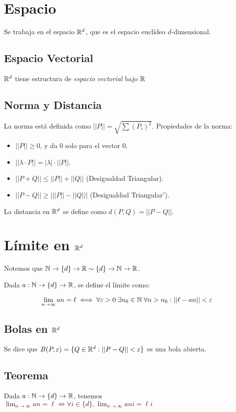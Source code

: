 \documentclass{article}
\begin{document}
\section{Espacio}
Se trabaja en el espacio $\mathbb{R}^d$, que es el espacio euclídeo $d$-dimensional.

\subsection{Espacio Vectorial}
$\mathbb{R}^d$ tiene estructura de \emph{espacio vectorial} bajo $\mathbb{R}$

\subsection{Norma y Distancia}
La norma  está definida como $||P|| = \sqrt{\sum (P_i)^2}$.
Propiedades de la norma:
\begin{itemize}
	\item $||P|| \geq 0$, y da $0$ solo para el vector $0$.
	\item $||\lambda \cdot P|| = |\lambda|\cdot||P||$.
	\item $||P+Q|| \leq ||P|| + ||Q||$ (Desigualdad Triangular).
	\item $||P-Q|| \geq \big|||P|| - ||Q||\big|$ (Desigualdad Triangular$'$).
\end{itemize}

La distancia en $\mathbb{R}^d$ se define como $d(P, Q) = ||P-Q||$.

\section{Límite en $\mathbb{R}^d$}
Notemos que $\mathbb{N} \to \{d\} \to \mathbb{R} \sim \{d\} \to \mathbb{N} \to \mathbb{R}$.

Dada $a : \mathbb{N} \to \{d\} \to \mathbb{R}$, se define el límite como:

\[\lim_{n \to \infty} an = \ell \iff \forall \varepsilon > 0 \;
	\exists n_0 \in \mathbb{N} \;\forall
n > n_0 : ||\ell - an|| < \varepsilon\]

\subsection{Bolas en $\mathbb{R}^d$}
Se dice que $B(P, \varepsilon) = \{Q \in \mathbb{R}^d : ||P - Q|| < \varepsilon\}$ es una bola abierta.

\subsection{Teorema}
Dada $a : \mathbb{N} \to \{d\} \to \mathbb{R}$, tenemos
$\lim_{n \to \infty} an = \ell \iff \forall i \in \{d\}, \lim_{n \to \infty} ani = \ell i$
\end{document}
